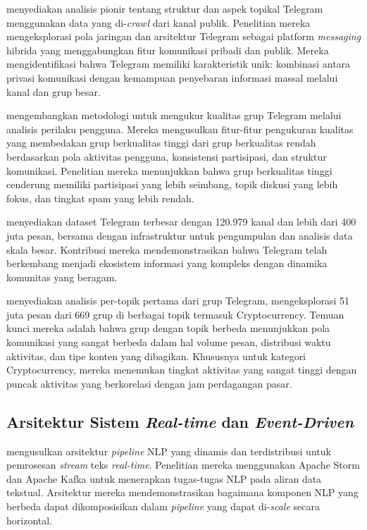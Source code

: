 \textcite{nobari2017} menyediakan analisis pionir tentang struktur dan aspek topikal Telegram menggunakan data yang di-\textit{crawl} dari kanal publik. Penelitian mereka mengeksplorasi pola jaringan dan arsitektur Telegram sebagai platform \textit{messaging} hibrida yang menggabungkan fitur komunikasi pribadi dan publik. Mereka mengidentifikasi bahwa Telegram memiliki karakteristik unik: kombinasi antara privasi komunikasi dengan kemampuan penyebaran informasi massal melalui kanal dan grup besar.

\textcite{hashemi2019} mengembangkan metodologi untuk mengukur kualitas grup Telegram melalui analisis perilaku pengguna. Mereka mengusulkan fitur-fitur pengukuran kualitas yang membedakan grup berkualitas tinggi dari grup berkualitas rendah berdasarkan pola aktivitas pengguna, konsistensi partisipasi, dan struktur komunikasi. Penelitian mereka menunjukkan bahwa grup berkualitas tinggi cenderung memiliki partisipasi yang lebih seimbang, topik diskusi yang lebih fokus, dan tingkat spam yang lebih rendah.

\textcite{lamorgia2024} menyediakan dataset Telegram terbesar dengan 120.979 kanal dan lebih dari 400 juta pesan, bersama dengan infrastruktur untuk pengumpulan dan analisis data skala besar. Kontribusi mereka mendemonstrasikan bahwa Telegram telah berkembang menjadi ekosistem informasi yang kompleks dengan dinamika komunitas yang beragam.

\textcite{perlo2025} menyediakan analisis per-topik pertama dari grup Telegram, mengeksplorasi 51 juta pesan dari 669 grup di berbagai topik termasuk Cryptocurrency. Temuan kunci mereka adalah bahwa grup dengan topik berbeda menunjukkan pola komunikasi yang sangat berbeda dalam hal volume pesan, distribusi waktu aktivitas, dan tipe konten yang dibagikan. Khususnya untuk kategori Cryptocurrency, mereka menemukan tingkat aktivitas yang sangat tinggi dengan puncak aktivitas yang berkorelasi dengan jam perdagangan pasar.

\subsection{Arsitektur Sistem \textit{Real-time} dan \textit{Event-Driven}}

\textcite{hamidi2021} mengusulkan arsitektur \textit{pipeline} NLP yang dinamis dan terdistribusi untuk pemrosesan \textit{stream} teks \textit{real-time}. Penelitian mereka menggunakan Apache Storm dan Apache Kafka untuk menerapkan tugas-tugas NLP pada aliran data tekstual. Arsitektur mereka mendemonstrasikan bagaimana komponen NLP yang berbeda dapat dikomposisikan dalam \textit{pipeline} yang dapat di-\textit{scale} secara horizontal.

